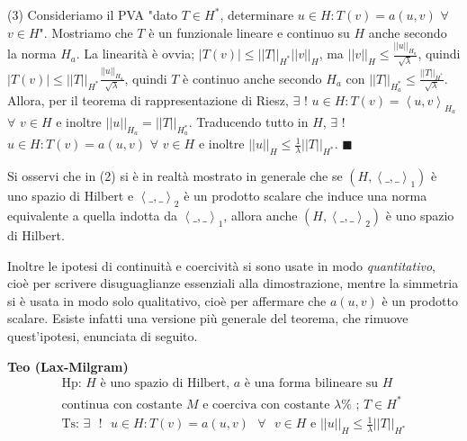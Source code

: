 \documentclass{article}
\begin{document}
(3) Consideriamo il PVA "dato $T\in H^{\ast }$, determinare $u\in H:T\left(
v\right) =a\left( u,v\right) $ $\forall $ $v\in H$". Mostriamo che $T$ \`{e}
un funzionale lineare e continuo su $H$ anche secondo la norma $H_{a}$. La
linearit\`{a} \`{e} ovvia; $\left\vert T\left( v\right) \right\vert \leq
\left\vert \left\vert T\right\vert \right\vert _{H^{\ast }}\left\vert
\left\vert v\right\vert \right\vert _{H}$, ma $\left\vert \left\vert
v\right\vert \right\vert _{H}\leq \frac{\left\vert \left\vert u\right\vert
\right\vert _{H_{a}}}{\sqrt{\lambda }}$, quindi $\left\vert T\left( v\right)
\right\vert \leq \left\vert \left\vert T\right\vert \right\vert _{H^{\ast }}%
\frac{\left\vert \left\vert u\right\vert \right\vert _{H_{a}}}{\sqrt{\lambda 
}}$, quindi $T$ \`{e} continuo anche secondo $H_{a}$ con $\left\vert
\left\vert T\right\vert \right\vert _{H_{a}^{\ast }}\leq \frac{\left\vert
\left\vert T\right\vert \right\vert _{H^{\ast }}}{\sqrt{\lambda }}$. Allora,
per il teorema di rappresentazione di Riesz, $\exists $ $!$ $u\in H:T\left(
v\right) =\left\langle u,v\right\rangle _{H_{a}}$ $\forall $ $v\in H$ e
inoltre $\left\vert \left\vert u\right\vert \right\vert _{H_{a}}=\left\vert
\left\vert T\right\vert \right\vert _{H_{a}^{\ast }}$. Traducendo tutto in $%
H $, $\exists $ $!$ $u\in H:T\left( v\right) =a\left( u,v\right) $ $\forall $
$v\in H$ e inoltre $\left\vert \left\vert u\right\vert \right\vert _{H}\leq 
\frac{1}{\lambda }\left\vert \left\vert T\right\vert \right\vert _{H^{\ast
}} $. $\blacksquare $

Si osservi che in (2) si \`{e} in realt\`{a} mostrato in generale che se $%
\left( H,\left\langle \_,\_\right\rangle _{1}\right) $ \`{e} uno spazio di
Hilbert e $\left\langle \_,\_\right\rangle _{2}$ \`{e} un prodotto scalare
che induce una norma equivalente a quella indotta da $\left\langle
\_,\_\right\rangle _{1}$, allora anche $\left( H,\left\langle
\_,\_\right\rangle _{2}\right) $ \`{e} uno spazio di Hilbert.

Inoltre le ipotesi di continuit\`{a} e coercivit\`{a} si sono usate in modo 
\textit{quantitativo}, cio\`{e} per scrivere disuguaglianze essenziali alla
dimostrazione, mentre la simmetria si \`{e} usata in modo solo qualitativo,
cio\`{e} per affermare che $a\left( u,v\right) $ \`{e} un prodotto scalare.
Esiste infatti una versione pi\`{u} generale del teorema, che rimuove
quest'ipotesi, enunciata di seguito.

\textbf{Teo (Lax-Milgram)}%
\begin{gather*}
\text{Hp: }H\text{ \`{e} uno spazio di Hilbert, }a\text{ \`{e} una forma
bilineare su }H\text{ } \\
\text{continua con costante }M\text{ e coerciva con costante }\lambda \text{%
; }T\in H^{\ast } \\
\text{Ts: }\exists \text{ }!\text{ }u\in H:T\left( v\right) =a\left(
u,v\right) \text{ }\forall \text{ }v\in H\text{ e }\left\vert \left\vert
u\right\vert \right\vert _{H}\leq \frac{1}{\lambda }\left\vert \left\vert
T\right\vert \right\vert _{H^{\ast }}
\end{gather*}
\end{document}
